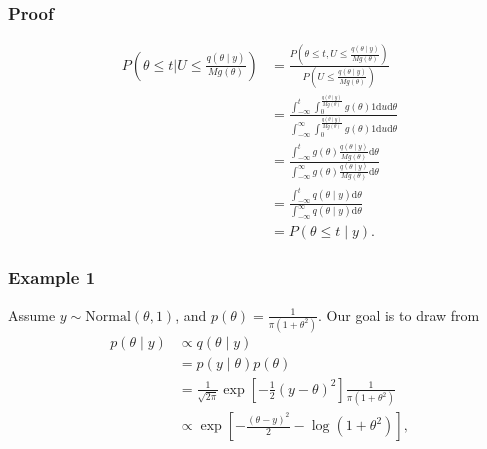 \documentclass{beamer}
\begin{document}
\begin{frame}[fragile]
\frametitle{Proof }

\begin{align*}
P\left( \theta \le t \bigg\rvert U \le \frac{q(\theta \mid y)}{M g(\theta) } \right) 
&= \frac{P\left( \theta \le t , U \le \frac{q(\theta \mid y)}{M g(\theta) } \right)}{P\left(U \le \frac{q(\theta \mid y)}{M g(\theta) } \right)} \\
&= \frac{\int_{-\infty}^t \int_0^{ \frac{q(\theta \mid y)}{M g(\theta) } }g(\theta)1 \text{d}u \text{d}\theta }{ \int_{-\infty}^{\infty} \int_0^{ \frac{q(\theta \mid y)}{M g(\theta) } }g(\theta)1 \text{d}u \text{d}\theta } \\
&= \frac{\int_{-\infty}^t g(\theta)\frac{q(\theta \mid y)}{M g(\theta) }  \text{d}\theta }{ \int_{-\infty}^{\infty} g(\theta)  \frac{q(\theta \mid y)}{M g(\theta) } \text{d}\theta } \\
&= \frac{\int_{-\infty}^t q(\theta \mid y)  \text{d}\theta }{ \int_{-\infty}^{\infty}  q(\theta \mid y)\text{d}\theta } \\
&= P(\theta \le t \mid y).
\end{align*}
\end{frame}


\begin{frame}[fragile]
\frametitle{Example 1}

Assume $y \sim \text{Normal}(\theta,1)$, and $p(\theta) = \frac{1}{\pi(1+\theta^2)}$. 
Our goal is to draw from
\begin{align*}
p(\theta \mid y) &\propto q(\theta\mid y) \\
&= p(y \mid \theta) p(\theta) \\
&= \frac{1}{\sqrt{2\pi}} \exp\left[-\frac{1}{2} (y-\theta)^2 \right] \frac{1}{\pi(1+\theta^2)} \\
&\propto \exp\left[-\frac{(\theta - y)^2}{2} - \log(1 + \theta^2) \right],
\end{align*}


\end{frame}
\end{document}
